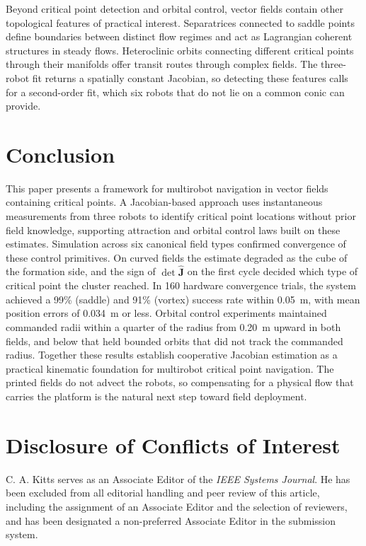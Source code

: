 \documentclass[lettersize,journal]{IEEEtran}
\newcommand{\rev}[1]{#1}
\begin{document}
Beyond critical point detection and orbital control, vector fields contain other topological features of practical interest. Separatrices connected to saddle points define boundaries between distinct flow regimes and act as Lagrangian coherent structures in steady flows. Heteroclinic orbits connecting different critical points through their manifolds offer transit routes through complex fields. The three-robot fit returns a spatially constant Jacobian, so detecting these features calls for a second-order fit, which six robots that do not lie on a common conic can provide.



\section{Conclusion}
\noindent

This paper presents a framework for multirobot navigation in vector fields containing critical points. A Jacobian-based approach uses instantaneous measurements from three robots to identify critical point locations without prior field knowledge, supporting attraction and orbital control laws built on these estimates. Simulation across six canonical field types confirmed convergence of these control primitives. On curved fields the estimate degraded as the cube of the formation side, and the sign of $\det\hat{\mathbf{J}}$ on the first cycle decided which type of critical point the cluster reached. In \rev{160} hardware convergence trials, the system achieved a \rev{99}\% (saddle) and \rev{91}\% (vortex) success rate within 0.05~m, with mean position errors of \rev{0.034}~m or less. Orbital control experiments maintained commanded radii within a quarter of the radius from \rev{0.20}~m upward in both fields, and below that held bounded orbits that did not track the commanded radius.
Together these results establish cooperative Jacobian estimation as a practical kinematic foundation for multirobot critical point navigation. The printed fields do not advect the robots, so compensating for a physical flow that carries the platform is the natural next step toward field deployment.


\section*{Disclosure of Conflicts of Interest}

C. A. Kitts serves as an Associate Editor of the \textit{IEEE Systems Journal}. He has been excluded from all editorial handling and peer review of this article, including the assignment of an Associate Editor and the selection of reviewers, and has been designated a non-preferred Associate Editor in the submission system.
\end{document}
